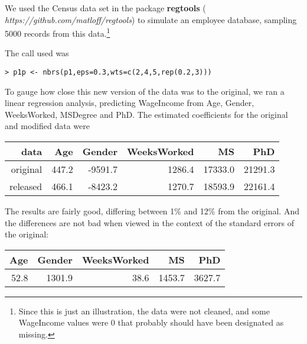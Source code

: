 \documentclass[11pt]{article}
\begin{document}
We used the Census data set in the package {\bf regtools} ({\it
https://github.com/matloff/regtools}) to simulate an employee
database, sampling 5000 records from this data.\footnote{Since this is
just an illustration, the data were not cleaned, and some WageIncome
values were 0 that probably should have been designated as missing.}


The call used was

\begin{lstlisting}
> p1p <- nbrs(p1,eps=0.3,wts=c(2,4,5,rep(0.2,3)))
\end{lstlisting}

To gauge how close this new version of the data was to the original, we
ran a linear regression analysis, predicting WageIncome from Age,
Gender, WeeksWorked, MSDegree and PhD.  The estimated coefficients for
the original and modified data were

\begin{tabular}{|r|r|r|r|r|r|}
\hline
data & Age & Gender & WeeksWorked & MS & PhD \\ \hline 
original & 447.2 & -9591.7 & 1286.4 & 17333.0 & 21291.3 \\ \hline 
released & 466.1 & -8423.2 & 1270.7 & 18593.9 & 22161.4 \\ \hline 
\end{tabular}

The results are fairly good, differing between 1\% and 12\% from the
original.  And the differences are not bad when viewed in the context of
the standard errors of the original:

\begin{tabular}{|r|r|r|r|r|}
\hline
Age & Gender & WeeksWorked & MS & PhD \\ \hline 
52.8 & 1301.9 & 38.6 & 1453.7 & 3627.7 \\ \hline
\end{tabular}
\end{document}
